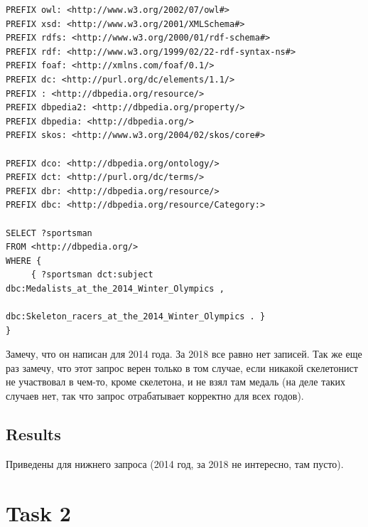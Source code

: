 \documentclass{article}
\begin{document}
\begin{verbatim}
PREFIX owl: <http://www.w3.org/2002/07/owl#>
PREFIX xsd: <http://www.w3.org/2001/XMLSchema#>
PREFIX rdfs: <http://www.w3.org/2000/01/rdf-schema#>
PREFIX rdf: <http://www.w3.org/1999/02/22-rdf-syntax-ns#>
PREFIX foaf: <http://xmlns.com/foaf/0.1/>
PREFIX dc: <http://purl.org/dc/elements/1.1/>
PREFIX : <http://dbpedia.org/resource/>
PREFIX dbpedia2: <http://dbpedia.org/property/>
PREFIX dbpedia: <http://dbpedia.org/>
PREFIX skos: <http://www.w3.org/2004/02/skos/core#>

PREFIX dco: <http://dbpedia.org/ontology/>
PREFIX dct: <http://purl.org/dc/terms/>
PREFIX dbr: <http://dbpedia.org/resource/>
PREFIX dbc: <http://dbpedia.org/resource/Category:>

SELECT ?sportsman
FROM <http://dbpedia.org/>
WHERE {
     { ?sportsman dct:subject dbc:Medalists_at_the_2014_Winter_Olympics ,
                              dbc:Skeleton_racers_at_the_2014_Winter_Olympics . }
}
\end{verbatim}

Замечу, что он написан для 2014 года. За 2018 все равно нет записей. Так же еще раз замечу, что этот запрос верен
только в том случае, если никакой скелетонист не участвовал в чем-то, кроме скелетона, и не взял там медаль (на деле таких случаев нет, так что запрос отрабатывает корректно для всех годов).

\subsection*{Results}

Приведены для нижнего запроса (2014 год, за 2018 не интересно, там пусто).

\noindent{}
 
\section*{Task 2}
\end{document}
